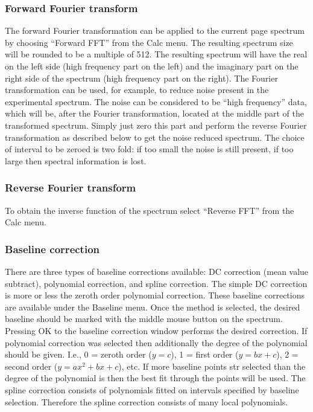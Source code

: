 \documentclass[byrevtex,amssymb,aps,pra,floatfix,letterpaper]{revtex4}
\begin{document}
\subsubsection{Forward Fourier transform}

The forward Fourier transformation can be applied to the current page spectrum by choosing ``Forward FFT'' from the Calc menu. The resulting spectrum size will be rounded to be a multiple of 512. The resulting spectrum will have the real on the left side (high frequency part on the left) and the imaginary part on the right side of the spectrum (high frequency part on the right). The Fourier transformation can be used, for example, to reduce noise present in the experimental spectrum. The noise can be considered to be ``high frequency'' data, which will be, after the Fourier transformation, located at the middle part of the transformed spectrum. Simply just zero this part and perform the reverse Fourier transformation as described below to get the noise reduced spectrum. The choice of interval to be zeroed is two fold: if too small the noise is still present, if too large then spectral information is lost.

\subsubsection{Reverse Fourier transform}

To obtain the inverse function of the spectrum select ``Reverse FFT'' from the Calc menu.

\subsubsection{Baseline correction}

There are three types of baseline corrections available: DC correction (mean value subtract), polynomial correction, and spline correction. The simple DC correction is more or less the zeroth order polynomial correction. These baseline corrections are available under the Baseline menu. Once the method is selected, the desired baseline should be marked with the middle mouse button on the spectrum. Pressing OK to the baseline correction window performs the desired correction. If polynomial correction was selected then additionally the degree of the polynomial should be given. I.e., 0 = zeroth order ($y = c$), 1 = first order ($y = bx + c$), 2 = second order ($y = ax^2 + bx + c$), etc. If more baseline points str selected than the degree of the polynomial is then the best fit through the points will be used. The spline correction consists of polynomials fitted on intervals specified by baseline selection. Therefore the spline correction consists of many local polynomials.
\end{document}
